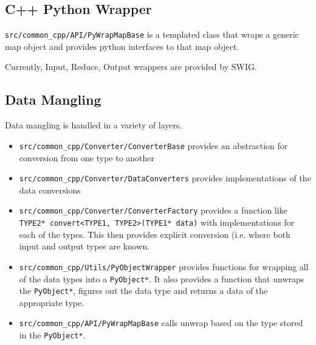 \subsection{C++ Python Wrapper}
\verb|src/common_cpp/API/PyWrapMapBase| is a templated class that wraps a 
generic map object and provides python interfaces to that map object.

Currently, Input, Reduce, Output wrappers are provided by SWIG.

\subsection{Data Mangling}
Data mangling is handled in a variety of layers.
\begin{itemize}
\item \verb|src/common_cpp/Converter/ConverterBase| provides an abstraction for
      conversion from one type to another
\item \verb|src/common_cpp/Converter/DataConverters| provides implementations
      of the data conversions
\item \verb|src/common_cpp/Converter/ConverterFactory| provides a function like
      \verb|TYPE2* convert<TYPE1, TYPE2>(TYPE1* data)| with implementations for
      each of the types. This then provides explicit conversion (i.e. where both
      input and output types are known.
\item \verb|src/common_cpp/Utils/PyObjectWrapper| provides functions for 
      wrapping all of the data types into a \verb|PyObject*|. It also provides a 
      function that unwraps the \verb|PyObject*|, figures out the data type and 
      returns a data of the appropriate type.
\item \verb|src/common_cpp/API/PyWrapMapBase| calls unwrap based on the type
      stored in the \verb|PyObject*|.
\end{itemize}


